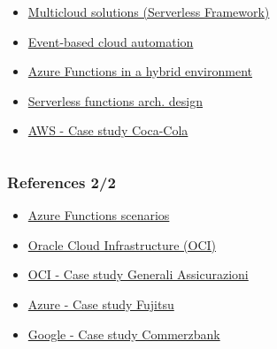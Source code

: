 \documentclass{beamer}
\begin{document}
\begin{frame}
\begin{columns}
\begin{column}{0.5\textwidth}
\begin{itemize}
					\item \href{https://learn.microsoft.com/en-us/azure/architecture/example-scenario/serverless/serverless-multicloud}{Multicloud solutions (Serverless Framework)}
					
					\item \href{https://learn.microsoft.com/en-us/azure/architecture/reference-architectures/serverless/cloud-automation}{Event-based cloud automation}
					
					\item \href{https://learn.microsoft.com/en-us/azure/architecture/hybrid/azure-functions-hybrid}{Azure Functions in a hybrid environment}
					
					\item \href{https://learn.microsoft.com/en-us/azure/architecture/serverless-quest/serverless-overview}{Serverless functions arch. design}
					
					\item \href{https://aws.amazon.com/solutions/case-studies/coca-cola-freestyle/}{AWS - Case study Coca-Cola}
				\end{itemize}
			\end{column}
		\end{columns}
	\end{frame}
	
	\begin{frame}
		\frametitle{References 2/2}
		\begin{itemize}
			\item \href{https://learn.microsoft.com/en-us/azure/azure-functions/functions-scenarios}{Azure Functions scenarios}
			
			\item \href{https://www.oracle.com/cloud/cloud-native/functions/}{Oracle Cloud Infrastructure (OCI)}
			
			\item \href{https://www.oracle.com/customers/generali/}{OCI - Case study Generali Assicurazioni}
			
			\item \href{https://customers.microsoft.com/en-GB/story/1533527200966057333-fujitsu-azure-partner-professional-services-business-critical}{Azure - Case study Fujitsu}
			
			\item \href{https://cloud.google.com/customers/commerzbankag}{Google - Case study Commerzbank}
		\end{itemize}
	\end{frame}
\end{document}
